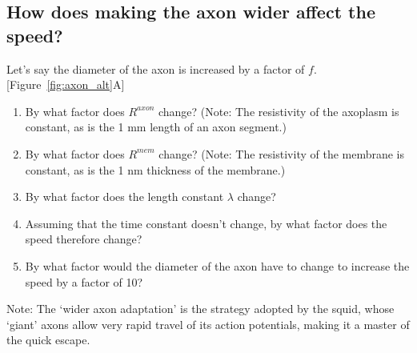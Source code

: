 \subsection*{How does making the axon wider affect the speed?}
Let's say the diameter of the axon is increased by a factor of $f$. [Figure~\ref{fig:axon_alt}A]
\begin{enumerate}
\itemsep-0.2em
\item By what factor does $R^{axon}$ change? (Note: The resistivity of the axoplasm is constant, as is the 1 mm length of an axon segment.)
\item By what factor does $R^{mem}$ change? (Note: The resistivity of the membrane is constant, as is the 1 nm thickness of the membrane.)
\item By what factor does the length constant $\lambda$ change?
\item Assuming that the time constant doesn't change, by what factor does the speed therefore change?
\item By what factor would the diameter of the axon have to change to increase the speed by a factor of 10?
\end{enumerate}
Note: The `wider axon adaptation' is the strategy adopted by the squid, whose `giant' axons allow very rapid travel of its action potentials, making it a master of the quick escape.

